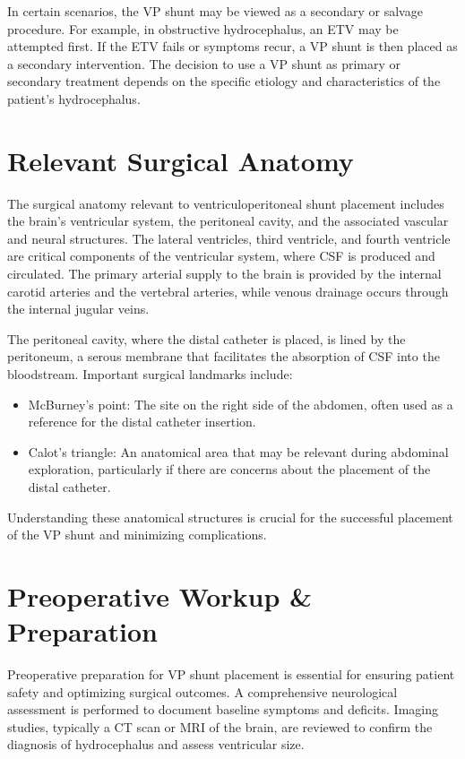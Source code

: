 In certain scenarios, the VP shunt may be viewed as a secondary or salvage procedure. For example, in obstructive hydrocephalus, an ETV may be attempted first. If the ETV fails or symptoms recur, a VP shunt is then placed as a secondary intervention. The decision to use a VP shunt as primary or secondary treatment depends on the specific etiology and characteristics of the patient's hydrocephalus.

\section*{Relevant Surgical Anatomy}
The surgical anatomy relevant to ventriculoperitoneal shunt placement includes the brain's ventricular system, the peritoneal cavity, and the associated vascular and neural structures. The lateral ventricles, third ventricle, and fourth ventricle are critical components of the ventricular system, where CSF is produced and circulated. The primary arterial supply to the brain is provided by the internal carotid arteries and the vertebral arteries, while venous drainage occurs through the internal jugular veins.

The peritoneal cavity, where the distal catheter is placed, is lined by the peritoneum, a serous membrane that facilitates the absorption of CSF into the bloodstream. Important surgical landmarks include:

\begin{itemize}
  \item McBurney's point: The site on the right side of the abdomen, often used as a reference for the distal catheter insertion.
  \item Calot's triangle: An anatomical area that may be relevant during abdominal exploration, particularly if there are concerns about the placement of the distal catheter.
\end{itemize}

Understanding these anatomical structures is crucial for the successful placement of the VP shunt and minimizing complications.

\section*{Preoperative Workup \& Preparation}
Preoperative preparation for VP shunt placement is essential for ensuring patient safety and optimizing surgical outcomes. A comprehensive neurological assessment is performed to document baseline symptoms and deficits. Imaging studies, typically a CT scan or MRI of the brain, are reviewed to confirm the diagnosis of hydrocephalus and assess ventricular size.

